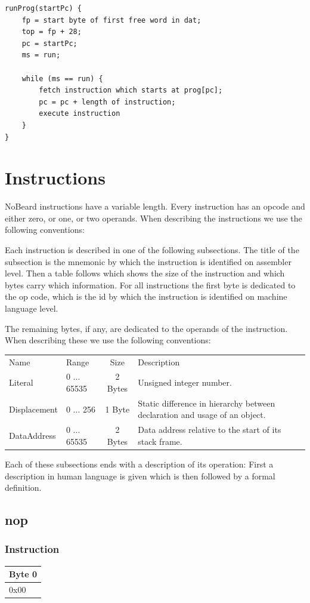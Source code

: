 \documentclass[11pt]{report}
\newcommand{\leongage}{NoBeard}
\newcommand{\onebyteinstruction}[1]{
\begin{tabular}{|p{3.9em}|}
\hline
\tiny{Byte 0} \\ \hline
#1  \\ \hline
\end{tabular}
}
\begin{document}
\begin{lstlisting}
runProg(startPc) {
	fp = start byte of first free word in dat;
	top = fp + 28;
	pc = startPc;
	ms = run;
	
	while (ms == run) {
		fetch instruction which starts at prog[pc];
		pc = pc + length of instruction;
		execute instruction
	}
}
\end{lstlisting}

\section{Instructions}
\leongage{} instructions have a variable length. Every instruction has an opcode and either zero, or one, or two operands. When describing the instructions we use the following conventions:

Each instruction is described in one of the following subsections. The title of the subsection is the mnemonic by which the instruction is identified on assembler level. Then a table follows which shows the size of the instruction and which bytes carry which information. For all instructions the first byte is dedicated to the op code, which is the id by which the instruction is identified on machine language level.

The remaining bytes, if any, are dedicated to the operands of the instruction. When describing these we use the following conventions:

\begin{tabular}{llcp{18.8em}}
Name & Range & Size & Description \\
Literal & 0 ... 65535 & 2 Bytes & Unsigned integer number. \\
Displacement & 0 ... 256 & 1 Byte & Static difference in hierarchy between declaration and usage of an object. \\
DataAddress & 0 ... 65535 & 2 Bytes & Data address relative to the start of its stack frame.
\end{tabular}

Each of these subsections ends with a description of its operation: First a description in human language is given which is then followed by a formal definition.

\subsection{nop}
\subsubsection{Instruction}
\onebyteinstruction{0x00}
\end{document}
